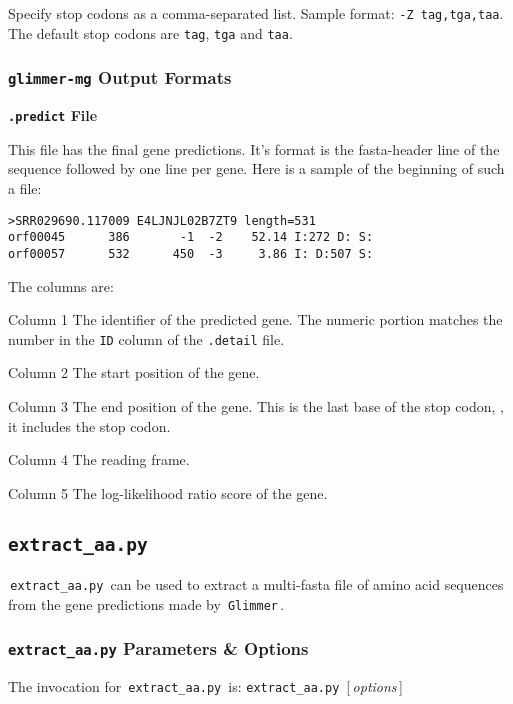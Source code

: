 \documentclass[fleqn,titlepage,11pt]{article}
\def\Desc#1{\,\mbox{\emph{#1}}\,}
\def\Pg#1{\texttt{#1}}
\begin{document}
  Specify stop codons as a comma-separated list.
  Sample format:  \verb`-Z tag,tga,taa`.
  The default stop codons are \Pg{tag}, \Pg{tga} and \Pg{taa}.
\el


\subsubsection{\Pg{glimmer-mg} Output Formats}

\smallskip
\noindent\textbf{\Pg{.predict} File}
\smallskip

This file has the final gene predictions.  It's format is the fasta-header
line of the sequence followed by one line per gene.  Here is a sample of the
beginning of such a file:
\BSV
\begin{verbatim}
>SRR029690.117009 E4LJNJL02B7ZT9 length=531
orf00045      386       -1  -2    52.14 I:272 D: S:
orf00057      532      450  -3     3.86 I: D:507 S:
\end{verbatim}
\ESV
The columns are:
\RaggedRight
\item[Column 1]
  The identifier of the predicted gene.  The numeric portion matches the
  number in the \Pg{ID} column of the \Pg{.detail} file.

\item[Column 2]
  The start position of the gene.

\item[Column 3]
  The end position of the gene.  This is the last base of the stop codon, \ie,
  it includes the stop codon.

\item[Column 4]
  The reading frame.

\item[Column 5]
  The log-likelihood ratio score of the gene.
\el

\subsection{\Pg{extract\_aa.py}}
\,\Pg{extract\_aa.py}\, can be used to extract a multi-fasta file of
amino acid sequences from the gene predictions made by
\,\Pg{Glimmer}\,.

\subsubsection{\Pg{extract\_aa.py} Parameters \& Options}

The invocation for \,\Pg{extract\_aa.py}\, is:
\bq
  \Pg{extract\_aa.py}\, [\Desc{options}]
\eq
\end{document}
